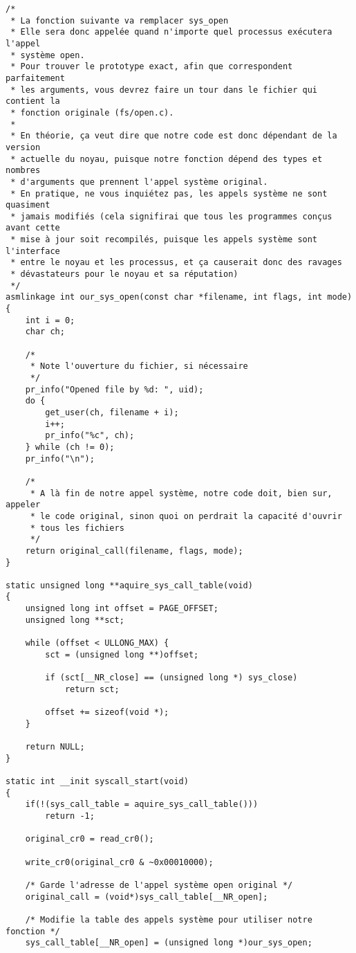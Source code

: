 \documentclass[11pt]{article}
\begin{document}
\begin{verbatim}
/*
 * La fonction suivante va remplacer sys_open
 * Elle sera donc appelée quand n'importe quel processus exécutera l'appel
 * système open.
 * Pour trouver le prototype exact, afin que correspondent parfaitement
 * les arguments, vous devrez faire un tour dans le fichier qui contient la
 * fonction originale (fs/open.c).
 *
 * En théorie, ça veut dire que notre code est donc dépendant de la version
 * actuelle du noyau, puisque notre fonction dépend des types et nombres
 * d'arguments que prennent l'appel système original.
 * En pratique, ne vous inquiétez pas, les appels système ne sont quasiment
 * jamais modifiés (cela signifirai que tous les programmes conçus avant cette
 * mise à jour soit recompilés, puisque les appels système sont l'interface
 * entre le noyau et les processus, et ça causerait donc des ravages
 * dévastateurs pour le noyau et sa réputation)
 */
asmlinkage int our_sys_open(const char *filename, int flags, int mode)
{
    int i = 0;
    char ch;

    /*
     * Note l'ouverture du fichier, si nécessaire
     */
    pr_info("Opened file by %d: ", uid);
    do {
        get_user(ch, filename + i);
        i++;
        pr_info("%c", ch);
    } while (ch != 0);
    pr_info("\n");

    /*
     * A là fin de notre appel système, notre code doit, bien sur, appeler
     * le code original, sinon quoi on perdrait la capacité d'ouvrir
     * tous les fichiers
     */
    return original_call(filename, flags, mode);
}

static unsigned long **aquire_sys_call_table(void)
{
    unsigned long int offset = PAGE_OFFSET;
    unsigned long **sct;

    while (offset < ULLONG_MAX) {
        sct = (unsigned long **)offset;

        if (sct[__NR_close] == (unsigned long *) sys_close)
            return sct;

        offset += sizeof(void *);
    }

    return NULL;
}

static int __init syscall_start(void)
{
    if(!(sys_call_table = aquire_sys_call_table()))
        return -1;

    original_cr0 = read_cr0();

    write_cr0(original_cr0 & ~0x00010000);

    /* Garde l'adresse de l'appel système open original */
    original_call = (void*)sys_call_table[__NR_open];

    /* Modifie la table des appels système pour utiliser notre fonction */
    sys_call_table[__NR_open] = (unsigned long *)our_sys_open;


\end{verbatim}
\end{document}
